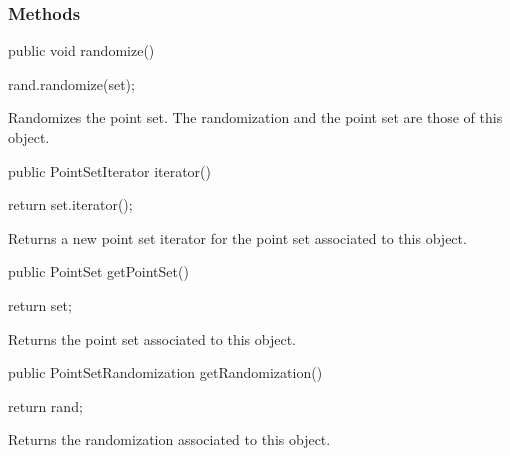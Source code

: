 \subsubsection*{Methods}
\begin{code}

   public void randomize() \begin{hide} {
       rand.randomize(set);
   }
   \end{hide}
\end{code}
\begin{tabb}
Randomizes the point set. The randomization and the point set
 are those of this object.
\end{tabb}
\begin{code}

   public PointSetIterator iterator()\begin{hide} {
      return set.iterator();
   }\end{hide}
\end{code}
\begin{tabb}
 Returns a new point set iterator for the point set associated to this object.
\end{tabb}
\begin{htmlonly}
\end{htmlonly}
\begin{code}

   public PointSet getPointSet()\begin{hide} {
      return set;
   }\end{hide}
\end{code}
\begin{tabb}
 Returns the point set associated to this object.
\end{tabb}
\begin{htmlonly}
\end{htmlonly}
\begin{code}

   public PointSetRandomization getRandomization()\begin{hide} {
      return rand;
   }\end{hide}
\end{code}
\begin{tabb}
 Returns the randomization associated to this object.
\end{tabb}
\begin{htmlonly}
\end{htmlonly}
\begin{code}\begin{hide}
}
\end{hide}\end{code}
